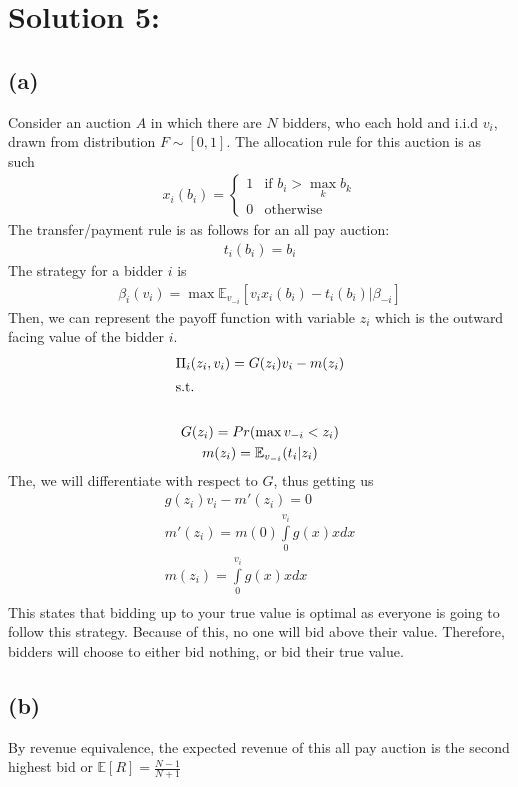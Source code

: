 \documentclass[10pt,a4paper]{article}
\begin{document}
\section*{Solution 5:}
  \subsection*{(a)}
    Consider an auction $A$ in which there are $N$ bidders, who each hold and i.i.d $v_i$, drawn from distribution $F\sim[0,1]$. The allocation rule for this auction is as such 
    \begin{gather*}
      x_i(b_i) = \begin{cases}
        1 & \text{if $b_i > \max_k b_k$} \\
        0 & \text{otherwise}
      \end{cases}
    \end{gather*}
    The transfer/payment rule is as follows for an all pay auction:
    \begin{gather*}
      t_i(b_i) = b_i
    \end{gather*}
    The strategy for a bidder $i$ is 
    \begin{gather*}
      \beta_i(v_i) = \max\mathbb{E}_{v_{-i}}[v_ix_i(b_i) - t_i(b_i)|\beta_{-i}]
    \end{gather*}
    Then, we can represent the payoff function with variable $z_i$ which is the outward facing value of the bidder $i$.
    \begin{gather*}
      \Pi_i(z_i, v_i) = G(z_i)v_i - m(z_i) \\
      \shortintertext{s.t.} \\
      G(z_i) = Pr(\max v_{-i}<z_i) \\
      m(z_i) = \mathbb{E}_{v_{-i}}(t_i|z_i)
    \end{gather*}
    The, we will differentiate with respect to $G$, thus getting us
    \begin{gather*}
      g(z_i)v_i - m'(z_i) = 0 \\
      m'(z_i) = m(0) \int\limits_0^{v_i}g(x)xdx \\
      m(z_i) = \int\limits_0^{v_i}g(x)xdx \\
    \end{gather*}
    This states that bidding up to your true value is optimal as everyone is going to follow this strategy. Because of this, no one will bid above their value. Therefore, bidders will choose to either bid nothing, or bid their true value.
  \subsection*{(b)}
    By revenue equivalence, the expected revenue of this all pay auction is the second highest bid or $\mathbb{E}[R] = \frac{N-1}{N+1}$
\end{document}
